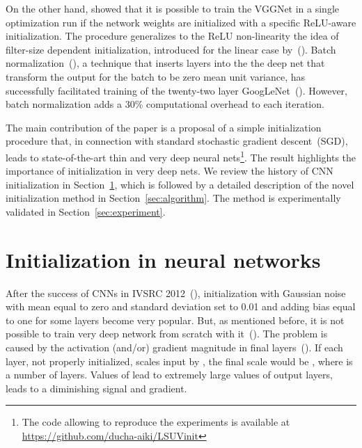 \documentclass{article} \clearpage{}\usepackage{iclr2016_conference,times}
\begin{document}
On the other hand, \cite{MSRA2015} showed that it is possible to train the VGGNet in a single optimization run if the network weights are initialized with a specific ReLU-aware initialization. The \cite{MSRA2015} procedure 
generalizes to the ReLU non-linearity the idea of filter-size dependent initialization, introduced for the linear case by~(\cite{Xavier10}).
Batch normalization~(\cite{BatchNorm2015}), a technique that inserts layers into the the deep net that transform the output for the batch to be zero mean unit variance, has successfully facilitated training of the twenty-two layer GoogLeNet~(\cite{Googlenet2015}).
However, batch normalization adds a 30\% computational overhead to each iteration. 

The main contribution of the paper is a proposal of a simple initialization procedure that, in connection with standard stochastic gradient descent~(SGD), leads to state-of-the-art thin and very deep neural nets\footnote{The code allowing to reproduce the experiments is available at \\ \url{https://github.com/ducha-aiki/LSUVinit}}.
The result highlights the importance of initialization in very deep nets. We review the history of CNN initialization in Section~\ref{sec:initialization-review}, which is followed by a detailed description of the novel initialization method in Section~\ref{sec:algorithm}. The method is experimentally validated in Section~\ref{sec:experiment}.

\section {Initialization in neural networks}
\label{sec:initialization-review}

After the success of CNNs in IVSRC 2012~(\cite{AlexNet2012}), initialization with Gaussian noise with mean equal to zero and standard deviation set to 0.01 and adding bias equal to one for some layers become very popular. But, as mentioned before, it is not possible to train very deep network from scratch with it~(\cite{VGGNet2015}).
The problem is caused by the activation (and/or) gradient magnitude in final layers~(\cite{MSRA2015}). If each layer, not properly initialized, scales input by , the final scale would be , where  is a number of layers. Values of  lead to extremely large values of output layers,   leads to a diminishing signal and gradient.
\end{document}
